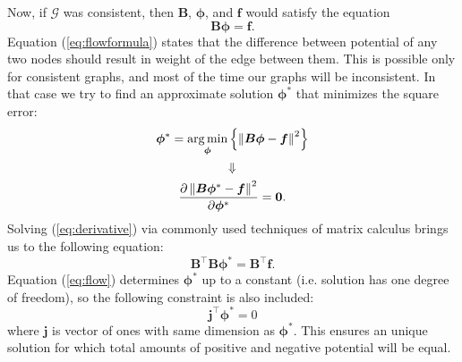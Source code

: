 \documentclass[letterpaper, 10pt, conference]{ieeeconf}
\newcommand{\matr}[1]{\mathbold{#1}}
\newcommand{\graph}[1]{\mathcal{#1}}
\newcommand{\T}{\top}
\DeclareMathOperator*{\argmin}{arg\min}
\begin{document}
    Now, if $\graph{G}$ was consistent, then $\matr{B}$, $\matr{\phi}$, and $\matr{f}$ would satisfy the equation
    \begin{equation}
    \label{eq:flowformula}
    \matr{B} \matr{\phi} = \matr{f}.
    \end{equation}
    Equation (\ref{eq:flowformula}) states that the difference between potential of any two nodes should result in weight of the edge between them.
    This is possible only for consistent graphs, and most of the time our graphs will be inconsistent.
    In that case we try to find an approximate solution $\matr{\phi^*}$ that minimizes the square error:
    \begin{gather}
    \matr{\phi^*} = \argmin_{\matr{\phi}} \left\{ \left \lVert \matr{B} \matr{\phi} - \matr{f}\textsl{} \right \rVert ^ 2 \right\} \nonumber \\ 
    \Downarrow \nonumber \\
    \label{eq:derivative}
    \frac{\partial \left \lVert \matr{B} \matr{\phi^*} - \matr{f} \right \rVert ^ 2}{\partial \matr{\phi^*}} = \mathbf{0}.
    \end{gather}
    Solving (\ref{eq:derivative}) via commonly used techniques of matrix calculus brings us to the following equation:
    \begin{equation}
    \label{eq:flow}
    \matr{B}^\T \matr{B} \matr{\phi^*} = \matr{B}^\T \matr{f}.
    \end{equation}
    Equation (\ref{eq:flow}) determines $\matr{\phi^*}$ up to a constant (i.e. solution has one degree of freedom), so the following constraint is also included:
    \begin{equation}
    \label{eq:sumiszero}
    \matr{j}^\T \matr{\phi^*} = 0
    \end{equation}
    where $\matr{j}$ is vector of ones with same dimension as $\matr{\phi^*}$.
    This ensures an unique solution for which total amounts of positive and negative potential will be equal.
    
\end{document}
